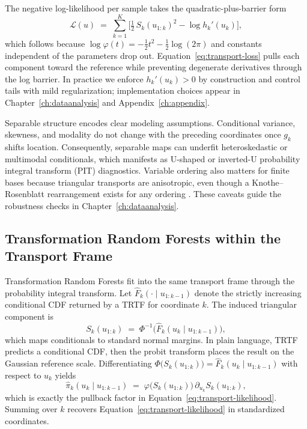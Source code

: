 \documentclass[11pt,a4paper,twoside]{book}\usepackage[]{graphicx}\usepackage[]{xcolor}
\begin{document}
The negative log-likelihood per sample takes the quadratic-plus-barrier form
\begin{equation}
  \mathcal{L}(u) \;=\; \sum_{k=1}^{K}\Big[\tfrac{1}{2}\,S_k(u_{1:k})^2 - \log h_k'(u_k)\Big],\label{eq:transport-loss}
\end{equation}
which follows because $\log \varphi(t) = -\tfrac{1}{2}t^2 - \tfrac{1}{2}\log(2\pi)$ and constants independent of the parameters drop out. Equation~\eqref{eq:transport-loss} pulls each component toward the reference while preventing degenerate derivatives through the log barrier. In practice we enforce $h_k'(u_k)>0$ by construction and control tails with mild regularization; implementation choices appear in Chapter~\ref{ch:dataanalysis} and Appendix~\ref{ch:appendix}.

Separable structure encodes clear modeling assumptions. Conditional variance, skewness, and modality do not change with the preceding coordinates once $g_k$ shifts location. Consequently, separable maps can underfit heteroskedastic or multimodal conditionals, which manifests as U-shaped or inverted-U probability integral transform (PIT) diagnostics. Variable ordering also matters for finite bases because triangular transports are anisotropic, even though a Knothe--Rosenblatt rearrangement exists for any ordering \citep{rosenblatt1952remarks,knothe1957contributions}. These caveats guide the robustness checks in Chapter~\ref{ch:dataanalysis}.

\subsection{Transformation Random Forests within the Transport Frame}\label{sec:transport-trtf}

Transformation Random Forests \citep{hothorn2017transformation,hothorn2018conditional,hothorn2021transformation} fit into the same transport frame through the probability integral transform. Let $\widehat F_k(\cdot \mid u_{1:k-1})$ denote the strictly increasing conditional CDF returned by a TRTF for coordinate $k$. The induced triangular component is
\begin{equation}
  S_k(u_{1:k}) \;=\; \Phi^{-1}\!\Big(\widehat F_k(u_k \mid u_{1:k-1})\Big),\label{eq:transport-trtf-map}
\end{equation}
which maps conditionals to standard normal margins. In plain language, TRTF predicts a conditional CDF, then the probit transform places the result on the Gaussian reference scale. Differentiating $\Phi\!\big(S_k(u_{1:k})\big)=\widehat F_k(u_k \mid u_{1:k-1})$ with respect to $u_k$ yields
\begin{equation}
  \widehat \pi_k(u_k \mid u_{1:k-1}) \;=\; \varphi\!\big(S_k(u_{1:k})\big)\,\partial_{u_k}S_k(u_{1:k}),\label{eq:transport-trtf-likelihood}
\end{equation}
which is exactly the pullback factor in Equation~\eqref{eq:transport-likelihood}. Summing over $k$ recovers Equation~\eqref{eq:transport-likelihood} in standardized coordinates.
\end{document}
